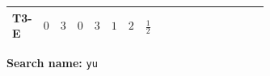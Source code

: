 \documentclass[8pt]{article}
\begin{document}
\begin{landscape}
\begin{longtable}{@{}llcccccc >{\raggedright\arraybackslash}p{0.21\linewidth} >{\raggedright\arraybackslash}p{0.21\linewidth} >{\raggedright\arraybackslash}p{0.21\linewidth}@{}}
\midrule
T3-E & $0$ & $3$ & $0$ & $3$ & $1$ & $2$ & $\frac{1}{2}$ & \scriptsize\adjustbox{max width=\linewidth}{$\begin{gathered} 3 \operatorname{Tr}\!\left({Y_d}\,\left({Y_d}\right)^{\dagger}\right) \left({Y_u}\right)_{ij}\end{gathered}$} & \scriptsize\adjustbox{max width=\linewidth}{$\begin{gathered} +\operatorname{Tr}\!\left({Y_e}\,\left({Y_e}\right)^{\dagger}\right) \left({Y_u}\right)_{ij}\end{gathered}$} & \scriptsize\adjustbox{max width=\linewidth}{$\begin{gathered} +3 \operatorname{Tr}\!\left({Y_u}\,\left({Y_u}\right)^{\dagger}\right) \left({Y_u}\right)_{ij}\end{gathered}$} \\
\midrule
\bottomrule
\end{longtable}
\clearpage
\noindent\textbf{Search name: }\texttt{yu}\par\smallskip

\end{landscape}
\end{document}
